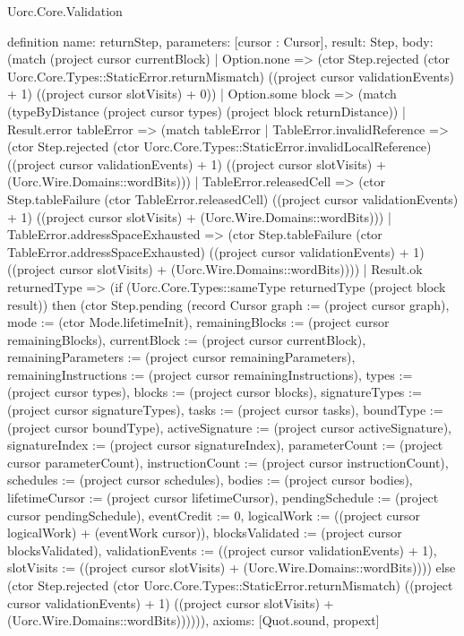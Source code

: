\begin{lexlean}{Uorc.Core.Validation}
\begin{semanticmodule}
definition{
  name: returnStep,
  parameters: [cursor : Cursor],
  result: Step,
  body: (match (project cursor currentBlock)
    | Option.none => (ctor Step.rejected (ctor Uorc.Core.Types::StaticError.returnMismatch) ((project cursor validationEvents) + 1) ((project cursor slotVisits) + 0))
    | Option.some block => (match (typeByDistance (project cursor types) (project block returnDistance))
      | Result.error tableError => (match tableError
        | TableError.invalidReference => (ctor Step.rejected (ctor Uorc.Core.Types::StaticError.invalidLocalReference) ((project cursor validationEvents) + 1) ((project cursor slotVisits) + (Uorc.Wire.Domains::wordBits)))
        | TableError.releasedCell => (ctor Step.tableFailure (ctor TableError.releasedCell) ((project cursor validationEvents) + 1) ((project cursor slotVisits) + (Uorc.Wire.Domains::wordBits)))
        | TableError.addressSpaceExhausted => (ctor Step.tableFailure (ctor TableError.addressSpaceExhausted) ((project cursor validationEvents) + 1) ((project cursor slotVisits) + (Uorc.Wire.Domains::wordBits))))
      | Result.ok returnedType => (if (Uorc.Core.Types::sameType returnedType (project block result)) then (ctor Step.pending (record Cursor {graph := (project cursor graph), mode := (ctor Mode.lifetimeInit), remainingBlocks := (project cursor remainingBlocks), currentBlock := (project cursor currentBlock), remainingParameters := (project cursor remainingParameters), remainingInstructions := (project cursor remainingInstructions), types := (project cursor types), blocks := (project cursor blocks), signatureTypes := (project cursor signatureTypes), tasks := (project cursor tasks), boundType := (project cursor boundType), activeSignature := (project cursor activeSignature), signatureIndex := (project cursor signatureIndex), parameterCount := (project cursor parameterCount), instructionCount := (project cursor instructionCount), schedules := (project cursor schedules), bodies := (project cursor bodies), lifetimeCursor := (project cursor lifetimeCursor), pendingSchedule := (project cursor pendingSchedule), eventCredit := 0, logicalWork := ((project cursor logicalWork) + (eventWork cursor)), blocksValidated := (project cursor blocksValidated), validationEvents := ((project cursor validationEvents) + 1), slotVisits := ((project cursor slotVisits) + (Uorc.Wire.Domains::wordBits))})) else (ctor Step.rejected (ctor Uorc.Core.Types::StaticError.returnMismatch) ((project cursor validationEvents) + 1) ((project cursor slotVisits) + (Uorc.Wire.Domains::wordBits)))))),
  axioms: [Quot.sound, propext]
}


\end{semanticmodule}
\end{lexlean}
